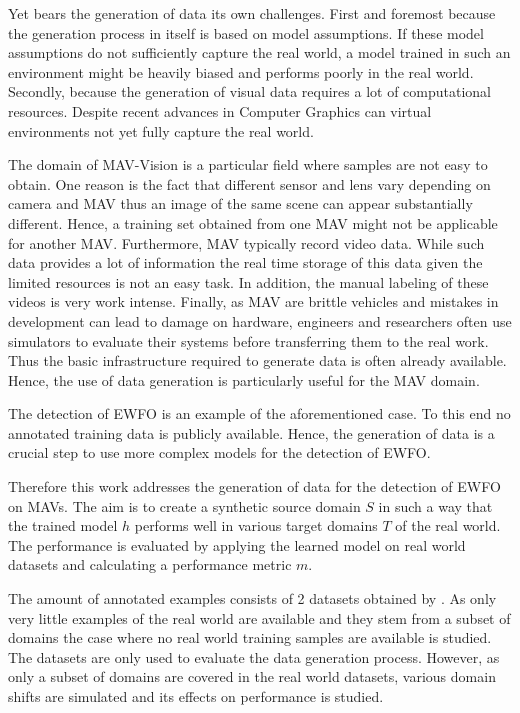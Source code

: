 Yet bears the generation of data its own challenges. First and foremost because the generation process in itself is based on model assumptions. If these model assumptions do not sufficiently capture the real world, a model trained in such an environment might be heavily biased and performs poorly in the real world. Secondly, because the generation of visual data requires a lot of computational resources. Despite recent advances in Computer Graphics can virtual environments not yet fully capture the real world.

The domain of \ac{MAV}-Vision is a particular field where samples are not easy to obtain. One reason is the fact that different sensor and lens vary depending on camera and \ac{MAV} thus an image of the same scene can appear substantially different. Hence, a training set obtained from one \ac{MAV} might not be applicable for another \ac{MAV}. Furthermore, \ac{MAV} typically record video data. While such data provides a lot of information the real time storage of this data given the limited resources is not an easy task. In addition, the manual labeling of these videos is very work intense. Finally, as \ac{MAV} are brittle vehicles and mistakes in development can lead to damage on hardware, engineers and researchers often use simulators to evaluate their systems before transferring them to the real work. Thus the basic infrastructure required to generate data is often already available. Hence, the use of data generation is particularly useful for the \ac{MAV} domain.

The detection of \ac{EWFO} is an example of the aforementioned case. To this end no annotated training data is publicly available. Hence, the generation of data is a crucial step to use more complex models for the detection of \ac{EWFO}. 

Therefore this work addresses the generation of data for the detection of \ac{EWFO} on \acp{MAV}. The aim is to create a synthetic source domain $S$ in such a way that the trained model $h$ performs well in various target domains $T$ of the real world. The performance is evaluated by applying the learned model on real world datasets and calculating a performance metric $m$.

The amount of annotated examples consists of 2 datasets obtained by . As only very little examples of the real world are available and they stem from a subset of domains the case where no real world training samples are available is studied. The datasets are only used to evaluate the data generation process. However, as only a subset of domains are covered in the real world datasets, various domain shifts are simulated and its effects on performance is studied.

